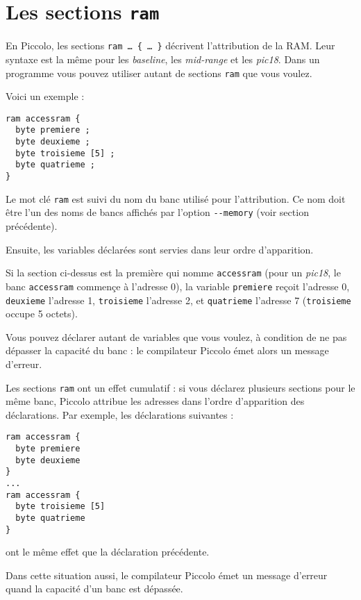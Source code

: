 \section{Les sections \texttt{ram}}

En Piccolo, les sections \texttt{ram … \{ … \}} décrivent l'attribution de la RAM. Leur syntaxe est la même pour les \emph{baseline}, les \emph{mid-range} et les \emph{pic18}. Dans un programme vous pouvez utiliser autant de sections \texttt{ram} que vous voulez.

Voici un exemple :

\begin{lstlisting}[language=piccolo]
ram accessram {
  byte premiere ;
  byte deuxieme ;
  byte troisieme [5] ;
  byte quatrieme ;
}
\end{lstlisting}

Le mot clé \texttt{ram} est suivi du nom du banc utilisé pour l'attribution. Ce nom doit être l'un des noms de bancs affichés par l'option \texttt{-{}-memory} (voir section précédente).

Ensuite, les variables déclarées sont servies dans leur ordre d'apparition.

Si la section ci-dessus est la première qui nomme \texttt{accessram} (pour un \emph{pic18}, le banc \texttt{accessram} commençe à l'adresse 0), la variable \texttt{premiere} reçoit l'adresse 0, \texttt{deuxieme} l'adresse 1, \texttt{troisieme} l'adresse 2, et \texttt{quatrieme} l'adresse 7 (\texttt{troisieme} occupe 5 octets).

Vous pouvez déclarer autant de variables que vous voulez, à condition de ne pas dépasser la capacité du banc : le compilateur Piccolo émet alors un message d'erreur.

Les sections \texttt{ram} ont un effet cumulatif : si vous déclarez plusieurs sections pour le même banc, Piccolo attribue les adresses dans l'ordre d'apparition des déclarations. Par exemple, les déclarations suivantes :

\begin{lstlisting}[language=piccolo]
ram accessram {
  byte premiere
  byte deuxieme
}
...
ram accessram {
  byte troisieme [5]
  byte quatrieme
}
\end{lstlisting}

ont le même effet que la déclaration précédente.

Dans cette situation aussi, le compilateur Piccolo émet un message d'erreur quand la capacité d'un banc est dépassée. 



